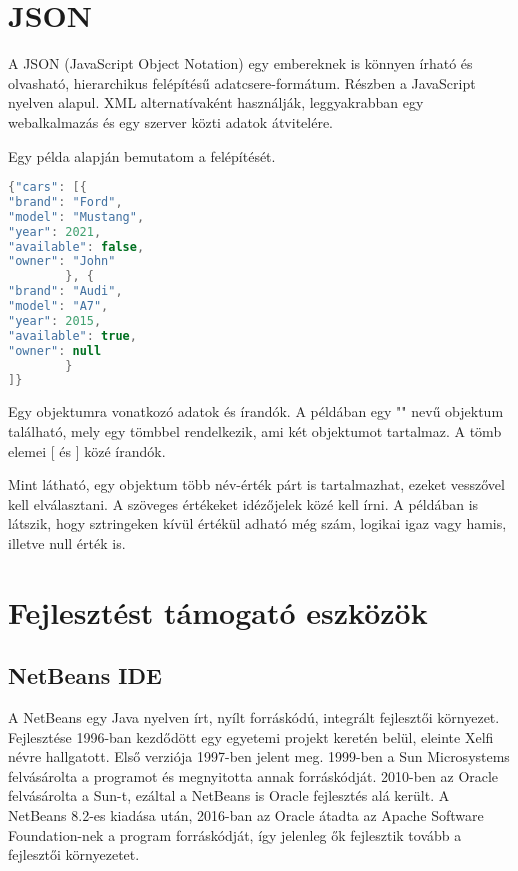 \section{JSON}

A JSON (JavaScript Object Notation) egy embereknek is könnyen írható és olvasható, hierarchikus felépítésű adatcsere-formátum.
Részben a JavaScript nyelven alapul.
XML alternatívaként használják, leggyakrabban egy webalkalmazás és egy szerver közti adatok átvitelére.\cite{json}

Egy példa alapján bemutatom a felépítését. 

\begin{lstlisting}[language=Java]
{"cars": [{ 
"brand": "Ford", 
"model": "Mustang", 
"year": 2021, 
"available": false, 
"owner": "John" 
        }, { 
"brand": "Audi", 
"model": "A7", 
"year": 2015, 
"available": true, 
"owner": null 
        } 
]} 
\end{lstlisting}

Egy objektumra vonatkozó adatok { és } írandók.
A példában egy "" nevű objektum található, mely egy tömbbel rendelkezik, ami két objektumot tartalmaz.
A tömb elemei [ és ] közé írandók.

Mint látható, egy objektum több név-érték párt is tartalmazhat, ezeket vesszővel kell elválasztani.
A szöveges értékeket idézőjelek közé kell írni.
A példában is látszik, hogy sztringeken kívül értékül adható még szám, logikai igaz vagy hamis, illetve null érték is. 



\section{Fejlesztést támogató eszközök}

\subsection{NetBeans IDE} 

A NetBeans egy Java nyelven írt, nyílt forráskódú, integrált fejlesztői környezet.
Fejlesztése 1996-ban kezdődött egy egyetemi projekt keretén belül, eleinte Xelfi névre hallgatott.
Első verziója 1997-ben jelent meg.
1999-ben a Sun Microsystems felvásárolta a programot és megnyitotta annak forráskódját.
2010-ben az Oracle felvásárolta a Sun-t, ezáltal a NetBeans is Oracle fejlesztés alá került.
A NetBeans 8.2-es kiadása után, 2016-ban az Oracle átadta az Apache Software Foundation-nek a program forráskódját, így jelenleg ők fejlesztik tovább a fejlesztői környezetet.\cite{netbeans, netbeans2}

